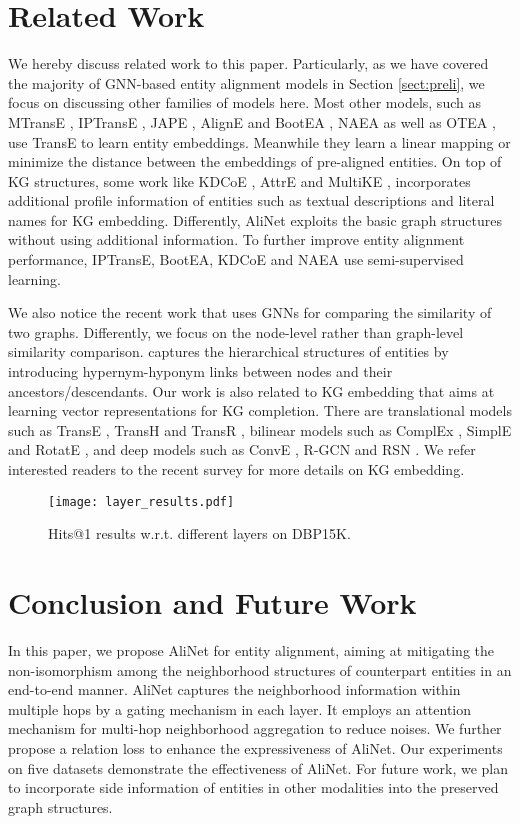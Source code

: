 \documentclass[letterpaper]{article} \usepackage{aaai20}  \usepackage{times}  \usepackage{helvet} \usepackage{courier}  \usepackage[hyphens]{url}  \usepackage{graphicx} \urlstyle{rm} \def\UrlFont{\rm}  \frenchspacing  \setlength{\pdfpagewidth}{8.5in}  \setlength{\pdfpageheight}{11in}  \usepackage{amsmath}
\begin{document}
\section{Related Work}
We hereby discuss related work to this paper. Particularly, as we have covered the majority of GNN-based entity alignment models in Section \ref{sect:preli}, we focus on discussing other families of models here. Most other models, such as MTransE \cite{MTransE}, IPTransE \cite{IPTransE}, JAPE \cite{JAPE}, AlignE and BootEA \cite{BootEA}, NAEA \cite{NAEA} as well as OTEA \cite{OTEA}, use TransE \cite{TransE} to learn entity embeddings. Meanwhile they learn a linear mapping or minimize the distance between the embeddings of pre-aligned entities. On top of KG structures, some work like KDCoE \cite{KDCoE}, AttrE \cite{AttrE} and MultiKE \cite{MultiKE}, incorporates additional profile information of entities such as textual descriptions and literal names for KG embedding. Differently, AliNet exploits the basic graph structures without using additional information. To further improve entity alignment performance, IPTransE, BootEA, KDCoE and NAEA use semi-supervised learning.

We also notice the recent work \cite{GMN} that uses GNNs for comparing the similarity of two graphs. Differently, we focus on the node-level rather than graph-level similarity comparison. \cite{KampffmeyerCLWZ19} captures the hierarchical structures of entities by introducing hypernym-hyponym links between nodes and their ancestors/descendants. Our work is also related to KG embedding that aims at learning vector representations for KG completion. There are translational models such as TransE \cite{TransE}, TransH \cite{TransH} and TransR \cite{TransR}, bilinear models such as ComplEx \cite{ComplEx}, SimplE \cite{SimplE} and RotatE \cite{RotatE}, and deep models such as ConvE \cite{ConvE}, R-GCN \cite{R-GCN} and RSN \cite{RSN}. We refer interested readers to the recent survey \cite{KRL} for more details on KG embedding.

\begin{figure}[!t]
	\center
	\texttt{[image: layer\_results.pdf]}
	\caption{Hits@1 results w.r.t. different layers on DBP15K.}
	\label{fig:layer}
\end{figure}

\section{Conclusion and Future Work}
In this paper, we propose AliNet for entity alignment, aiming at mitigating the non-isomorphism among the neighborhood structures of counterpart entities in an end-to-end manner. AliNet captures the neighborhood information within multiple hops by a gating mechanism in each layer. It employs an attention mechanism for multi-hop neighborhood aggregation to reduce noises. We further propose a relation loss to enhance the expressiveness of AliNet. Our experiments on five datasets demonstrate the effectiveness of AliNet. For future work, we plan to incorporate side information of entities in other modalities into the preserved graph structures.
\end{document}
